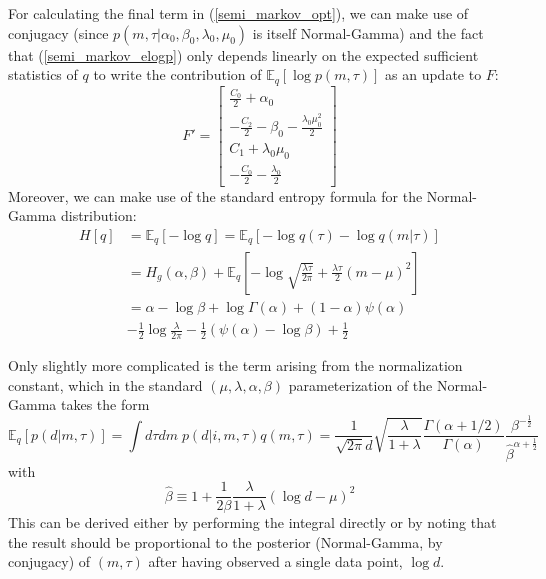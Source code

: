 \documentclass[10pt,letterpaper]{article}
\begin{document}
For calculating the final term in (\ref{semi_markov_opt}), we can make use of conjugacy (since $p(m, \tau|\alpha_0, \beta_0, \lambda_0, \mu_0)$ is itself Normal-Gamma) and the fact that (\ref{semi_markov_elogp}) only depends linearly on the expected sufficient statistics of $q$ to write the contribution of $\mathbb{E}_q[\log p(m, \tau)]$ as an update to $F$:
\begin{equation}
    F' =
    \begin{bmatrix}
        \frac{C_0}{2} + \alpha_0 \\
        -\frac{C_2}{2} -\beta_0 - \frac{\lambda_0\mu_0^2}{2} \\
        C_1 + \lambda_0\mu_0 \\
        -\frac{C_0}{2} - \frac{\lambda_0}{2}
    \end{bmatrix}
\end{equation}
Moreover, we can make use of the standard entropy formula for the Normal-Gamma distribution:
\begin{align}
    \label{normal_gamma_entropy}
    H[q] &= \mathbb{E}_q[-\log q] = \mathbb{E}_q[-\log q(\tau) - \log q(m|\tau)] \nonumber\\
    &= H_g(\alpha, \beta) + \mathbb{E}_q\left[
    -\log \sqrt{\frac{\lambda\tau}{2\pi}} +
    \frac{\lambda\tau}{2} (m - \mu)^2
    \right] \nonumber\\
    &= \alpha - \log \beta + \log \Gamma(\alpha) + (1 - \alpha) \psi(\alpha) \nonumber\\
    & - \frac{1}{2} \log \frac{\lambda}{2\pi} - \frac{1}{2} \left(\psi(\alpha) - \log \beta\right)
    + \frac{1}{2}
\end{align}

Only slightly more complicated is the term arising from the normalization constant, which in the standard $(\mu, \lambda, \alpha, \beta)$ parameterization of the Normal-Gamma takes the form
\begin{equation}
    \label{e_normal_gamma}
    \mathbb{E}_q[p(d|m, \tau)] = \int d\tau dm \; p(d|i, m, \tau) q(m, \tau)
    = \frac{1}{\sqrt{2\pi}d} \sqrt{\frac{\lambda}{1 + \lambda}}
    \frac{\Gamma(\alpha + 1/2)}{\Gamma(\alpha)}
    \frac{\beta^{-\frac{1}{2}}}{\hat{\beta}^{\alpha + \frac{1}{2}}}
\end{equation}
with
\begin{equation}
    \hat{\beta} \equiv 1 + \frac{1}{2\beta} \frac{\lambda}{1 + \lambda}
    (\log d - \mu)^2
\end{equation}
This can be derived either by performing the integral directly or by noting that the result should be proportional to the posterior (Normal-Gamma, by conjugacy) of $(m, \tau)$ after having observed a single data point, $\log d$.
\end{document}
